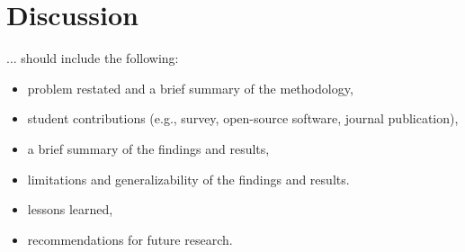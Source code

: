 \chapter{Discussion}
\label{cha:chapter7}
... should include the following:
\begin{itemize}

  \item problem restated and a brief summary of the methodology,
  \item student contributions (e.g., survey, open-source software, journal publication),
  \item a brief summary of the findings and results,
  \item limitations and generalizability of the findings and results.
  \item lessons learned,
  \item recommendations for future research.

\end{itemize}


